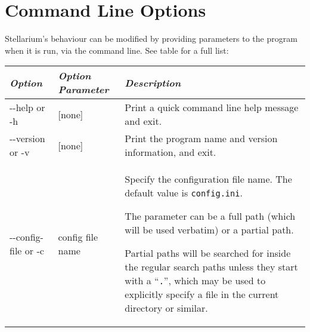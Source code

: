 \chapter{Command Line Options}\label{command-line-options}

Stellarium's behaviour can be modified by providing parameters to the
program when it is run, via the command line. See table for a full list:

\begin{longtabu} to \textwidth {l|l|X}
\toprule
\emph{Option} & \emph{Option Parameter} & \emph{Description}\tabularnewline
\midrule
-\/-help or -h & {[}none{]} & Print a quick command line help message
and exit. \tabularnewline
\midrule
-\/-version or -v & {[}none{]} & Print the program name and version
information, and exit. \tabularnewline
\midrule
-\/-config-file or -c & config file name & Specify the configuration
file name. The default value is \texttt{config.ini}.

The parameter can be a full path (which will be used verbatim) or a
partial path.

Partial paths will be searched for inside the regular search paths
unless they start with a ``\texttt{.}'', which may be used to explicitly
specify a file in the current directory or similar.


\end{longtabu}
